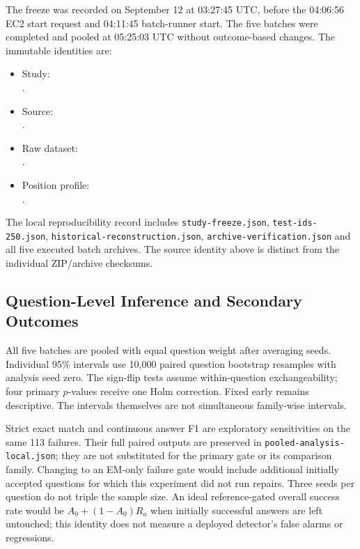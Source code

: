 \documentclass{article}
\begin{document}
The freeze was recorded on September 12 at 03:27:45 UTC, before the
04:06:56 EC2 start request and 04:11:45 batch-runner start. The five batches
were completed and pooled at 05:25:03 UTC without outcome-based changes.
The immutable identities are:
\begin{itemize}
\item Study:\\
{\footnotesize{}}.
\item Source:\\
{\footnotesize{}}.
\item Raw dataset:\\
{\footnotesize{}}.
\item Position profile:\\
{\footnotesize{}}.
\end{itemize}
The local reproducibility record includes \texttt{study-freeze.json},
\texttt{test-ids-250.json}, \texttt{historical-reconstruction.json},
\texttt{archive-verification.json} and all five executed batch archives.
The source identity above is distinct from the individual ZIP/archive checksums.

\subsection{Question-Level Inference and Secondary Outcomes}
All five batches are pooled with equal question weight after averaging
seeds. Individual 95\% intervals use 10,000 paired question bootstrap
resamples with analysis seed zero. The sign-flip tests assume
within-question exchangeability; four primary $p$-values receive one Holm
correction. Fixed early remains descriptive. The intervals themselves
are not simultaneous family-wise intervals.

\begin{table}[h]
\centering
\caption{Prespecified treatment-minus-control comparisons in repair success,
in percentage points. All use 113 paired question means. Intervals are
individual 95\% bootstrap intervals; $p$-values are paired sign-flip tests.}
\label{tab:main_contrasts}
\small

\end{table}

Strict exact match and continuous answer F1 are exploratory sensitivities
on the same 113 failures. Their full paired outputs are preserved in
\texttt{pooled-analysis-local.json}; they are not substituted for the
primary gate or its comparison family. Changing to an EM-only failure
gate would include additional initially accepted questions for which this
experiment did not run repairs. Three seeds per question do not triple
the sample size. An ideal reference-gated overall success rate would be
$A_0+(1-A_0)R_a$ when initially successful answers are left untouched;
this identity does not measure a deployed detector's false alarms or regressions.
\end{document}
